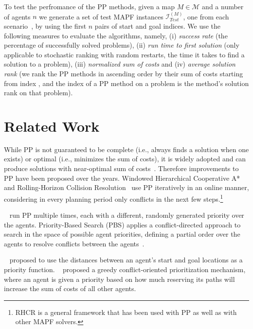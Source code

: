 \documentclass[letterpaper]{article} %
\begin{document}
To test the perfromance of the PP methods, given a map $ M \in \mathcal{M} $ and a number of agents $ n $ we generate a set of test MAPF instances $ \mathcal{I}^{(M)}_{Test} $, one from each scenario~\citep{stern219multi}, by using the first $ n $ pairs of start and goal indices. We use the following measures to evaluate the algorithms, namely, (i) \textit{success rate} (the percentage of successfully solved problems), (ii) \textit{run time to first solution} (only applicable to stochastic ranking with random restarts, the time it takes to find a solution to a problem), (iii) \textit{normalized sum of costs} and (iv) \textit{average solution rank} (we rank the PP methods in ascending order by their sum of costs starting from index $  $, and the index of a PP method on a problem is the method's solution rank on that problem).

\section{Related Work}
\label{sec:relatedWork}

While PP is not guaranteed to be complete (i.e., always finds a solution when one exists) or optimal (i.e., minimizes the sum of costs), it is widely adopted and can produce solutions with near-optimal sum of costs~\citep{morag222online}. Therefore improvements to PP have been proposed over the years. Windowed Hierarchical Cooperative A*~\citep{silver25cooperative} and  Rolling-Horizon Collision Resolution~\citep{li221lifelong} use PP iteratively in an online manner, considering in every planning period only conflicts in the next few steps.\footnote{RHCR is a general framework that has been used with PP as well as with other MAPF solvers.}

~\citet{bennewitz22finding} run PP multiple times, each with a different, randomly generated priority over the agents. Priority-Based Search (PBS) applies a conflict-directed approach to search in the space of possible agent priorities, defining a partial order over the agents to resolve conflicts between the agents~\citep{ma219searching}.

~\citet{van25prioritized} proposed to use the distances between an agent's start and goal locations as a priority function. ~\citet{bnaya214conflict} proposed a greedy conflict-oriented prioritization mechanism, where an agent is given a priority based on how much reserving its paths will increase the sum of costs of all other agents.
\end{document}
